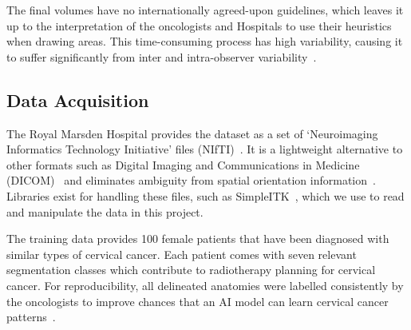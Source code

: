 \documentclass[11pt,twoside]{report}
\begin{document}
The final volumes have no internationally agreed-upon guidelines, which leaves it up to the interpretation of the oncologists and Hospitals to use their heuristics when drawing areas.  This time-consuming process has high variability, causing it to suffer significantly from inter and intra-observer variability~\cite{Lin2021-oz}. 

\subsection{Data Acquisition}

The Royal Marsden Hospital provides the dataset as a set of `Neuroimaging Informatics Technology Initiative' files (NIfTI)~\cite{file-formats}. It is a lightweight alternative to other formats such as Digital Imaging and Communications in Medicine (DICOM)~\cite{file-formats} and eliminates ambiguity from spatial orientation information~\cite{dicom-to-nifti-conversion}. Libraries exist for handling these files, such as SimpleITK~\cite{SimpleITK-paper}, which we use to read and manipulate the data in this project. %

The training data provides 100 female patients that have been diagnosed with similar types of cervical cancer. Each patient comes with seven relevant segmentation classes which contribute to radiotherapy planning for cervical cancer. For reproducibility, all delineated anatomies were labelled consistently by the oncologists to improve chances that an AI model can learn cervical cancer patterns~\cite{AMLART-data}. 



\end{document}
